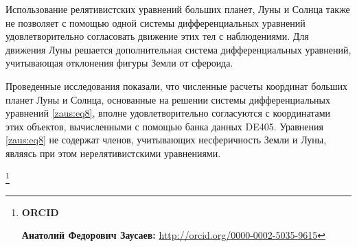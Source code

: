 Использование релятивистских уравнений больших планет, Луны и Солнца также не позволяет с помощью одной системы дифференциальных уравнений удовлетворительно согласовать движение этих тел с наблюдениями. Для движения Луны решается дополнительная система дифференциальных уравнений, учитывающая отклонения фигуры Земли от сфероида.

Проведенные исследования показали, что численные расчеты координат больших планет Луны и Солнца, основанные на решении системы дифференциальных уравнений \eqref{zaus:eq8}, вполне удовлетворительно согласуются с координатами этих объектов, вычисленными с помощью банка данных DE405. 
Уравнения \eqref{zaus:eq8} не содержат членов, учитывающих несферичность Земли и Луны, являясь при этом нерелятивистскими уравнениями.

\thanks{{\bf ORCID}

{\bf Анатолий Федорович Заусаев:} \url{http://orcid.org/0000-0002-5035-9615}

}


\RusRef


